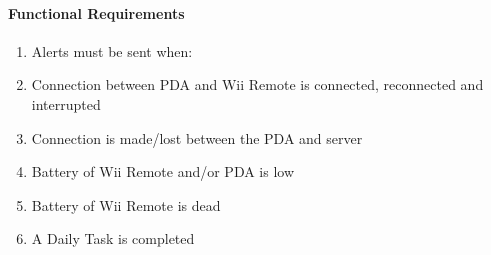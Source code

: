 \documentclass{article}
\begin{document}
\paragraph {Functional Requirements}
\begin{enumerate}
\item Alerts must be sent when:
\item Connection between PDA and Wii Remote is connected, reconnected and interrupted
\item Connection is made/lost between the PDA and server
\item Battery of Wii Remote and/or PDA is low
\item Battery of Wii Remote is dead
\item A Daily Task is completed		 
\end{enumerate}
\end{document}
